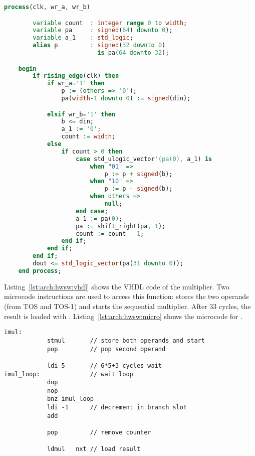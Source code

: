 \begin{lstlisting}[float, caption={Booth multiplier in VHDL},
language=VHDL, label=lst:arch:hwsw:vhdl]
    process(clk, wr_a, wr_b)

        variable count  : integer range 0 to width;
        variable pa     : signed(64) downto 0);
        variable a_1    : std_logic;
        alias p         : signed(32 downto 0)
                          is pa(64 downto 32);

    begin
        if rising_edge(clk) then
            if wr_a='1' then
                p := (others => '0');
                pa(width-1 downto 0) := signed(din);

            elsif wr_b='1' then
                b <= din;
                a_1 := '0';
                count := width;
            else
                if count > 0 then
                    case std_ulogic_vector'(pa(0), a_1) is
                        when "01" =>
                            p := p + signed(b);
                        when "10" =>
                            p := p - signed(b);
                        when others =>
                            null;
                    end case;
                    a_1 := pa(0);
                    pa := shift_right(pa, 1);
                    count := count - 1;
                end if;
            end if;
        end if;
        dout <= std_logic_vector(pa(31 downto 0));
    end process;
\end{lstlisting}
%
Listing~\ref{lst:arch:hwsw:vhdl} shows the VHDL code of the
multiplier. Two microcode instructions are used to access this
function:  stores the two operands (from TOS and TOS-1)
and starts the sequential multiplier. After 33 cycles, the result is
loaded with . Listing~\ref{lst:arch:hwsw:micro} shows
the microcode for .

\begin{lstlisting}[float, caption={Microcode to access the Booth multiplier},
label=lst:arch:hwsw:micro]
    imul:
            stmul       // store both operands and start
            pop         // pop second operand

            ldi 5       // 6*5+3 cycles wait
imul_loop:              // wait loop
            dup
            nop
            bnz imul_loop
            ldi -1      // decrement in branch slot
            add

            pop         // remove counter

            ldmul   nxt // load result
\end{lstlisting}


